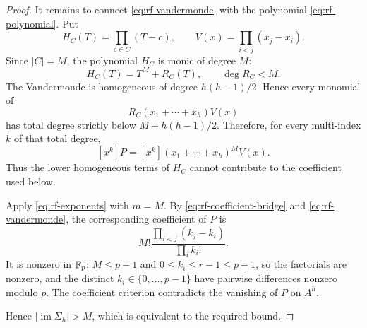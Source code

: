 \begin{proof}
It remains to connect \eqref{eq:rf-vandermonde} with the polynomial \eqref{eq:rf-polynomial}.  Put
\[
H_C(T)=\prod_{c\in C}(T-c),
\qquad
V(x)=\prod_{i<j}(x_j-x_i).
\]
Since $|C|=M$, the polynomial $H_C$ is monic of degree $M$:
\begin{equation}\label{eq:rf-top-homogeneous}
H_C(T)=T^M+R_C(T),
\qquad \deg R_C<M.
\end{equation}
The Vandermonde is homogeneous of degree $h(h-1)/2$.  Hence every monomial of
\[
R_C(x_1+\cdots+x_h)V(x)
\]
has total degree strictly below $M+h(h-1)/2$.  Therefore, for every multi-index $k$ of that total degree,
\begin{equation}\label{eq:rf-coefficient-bridge}
[x^k]P
=
[x^k](x_1+\cdots+x_h)^M V(x).
\end{equation}
Thus the lower homogeneous terms of $H_C$ cannot contribute to the coefficient used below.

Apply \eqref{eq:rf-exponents} with $m=M$.  By \eqref{eq:rf-coefficient-bridge} and \eqref{eq:rf-vandermonde}, the corresponding coefficient of $P$ is
\begin{equation}\label{eq:rf-nonzero-coefficient}
M!\frac{\prod_{i<j}(k_j-k_i)}{\prod_i k_i!}.
\end{equation}
It is nonzero in $\mathbb F_p$: $M\le p-1$ and $0\le k_i\le r-1\le p-1$, so the factorials are nonzero, and the distinct $k_i\in\{0,\ldots,p-1\}$ have pairwise differences nonzero modulo $p$.  The coefficient criterion contradicts the vanishing of $P$ on $A^h$.

Hence $|\operatorname{im}\Sigma_h|>M$, which is equivalent to the required bound.
\end{proof}
